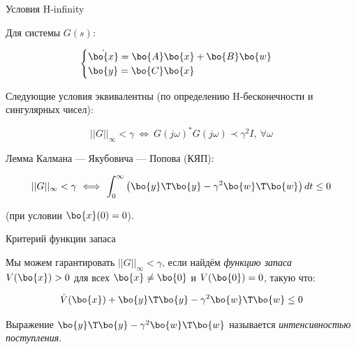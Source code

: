 \documentclass{beamer}
\begin{document}
	
	\begin{frame}{Условия H-infinity}
		\begin{flushleft}
			
			Для системы $G(s)$:
			
			\begin{equation}
				\begin{cases}
					\dot{\bo{x}} = \bo{A}\bo{x}+\bo{B}\bo{w}
					\\
					\bo{y} = \bo{C}\bo{x}
				\end{cases}
			\end{equation}
			
			Следующие условия эквивалентны (по определению H-бесконечности и сингулярных чисел):
			
			\begin{equation}
				||G||_\infty < \gamma \ \Longleftrightarrow \ G(j\omega)^* G(j\omega) \prec \gamma^2 I, \ \forall \omega
			\end{equation}
			
			Лемма Калмана — Якубовича — Попова (КЯП):
			
			\begin{equation}
				||G||_\infty < \gamma \ \Longleftrightarrow \ \int_0^\infty \left(\bo{y}\T \bo{y} - \gamma^2 \bo{w}\T \bo{w} \right) dt \leq 0
			\end{equation}
			
			\textcolor{mygray}{(при условии $\bo{x}(0) = 0$).}
			
		\end{flushleft}
	\end{frame}
	
	
	\begin{frame}{Критерий функции запаса}
		\begin{flushleft}
			
			Мы можем гарантировать $||G||_\infty < \gamma$, если найдём \emph{функцию запаса} $V( \bo{x}) > 0$ для всех $\bo{x} \neq \bo{0}$ и $V(\bo{0}) = 0$, такую что:
			
			\begin{equation}
				\dot V(\bo{x}) + \bo{y}\T \bo{y} - \gamma^2 \bo{w}\T \bo{w} \leq 0
			\end{equation}
			
			Выражение $\bo{y}\T \bo{y} - \gamma^2 \bo{w}\T \bo{w} $ называется \emph{интенсивностью поступления}.
			
		\end{flushleft}
	\end{frame}
	
\end{document}

